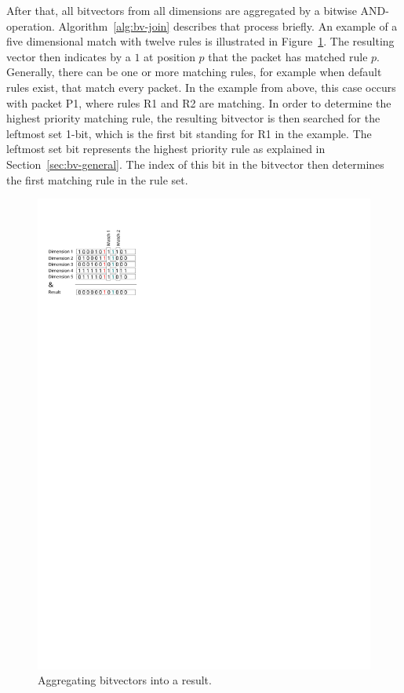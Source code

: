 \documentclass[a4paper,
		12pt,
		parskip=full,
		titlepage
		]{scrartcl}
\begin{document}
After that, all bitvectors from all dimensions are aggregated by a bitwise AND-operation.
Algorithm~\ref{alg:bv-join} describes that process briefly.
An example of a five dimensional match with twelve rules is illustrated in Figure~\ref{fig:bv-and}.
The resulting vector then indicates by a $1$ at position $p$ that the packet has matched rule $p$.
Generally, there can be one or more matching rules, for example when default rules exist, that match every packet.
In the example from above, this case occurs with packet P1, where rules R1 and R2 are matching.
In order to determine the highest priority matching rule, the resulting 
bitvector is then searched for the leftmost set 1-bit, which is the first bit standing for R1 in the example.
The leftmost set bit represents the highest priority rule as explained in Section~\ref{sec:bv-general}.
The index of this bit in the bitvector then determines the first matching rule in the rule set.

\begin{figure}
\centering
\includegraphics[height=0.3\textheight]{images/matching}
\caption{Aggregating bitvectors into a result.}
\label{fig:bv-and}
\end{figure}
\end{document}
